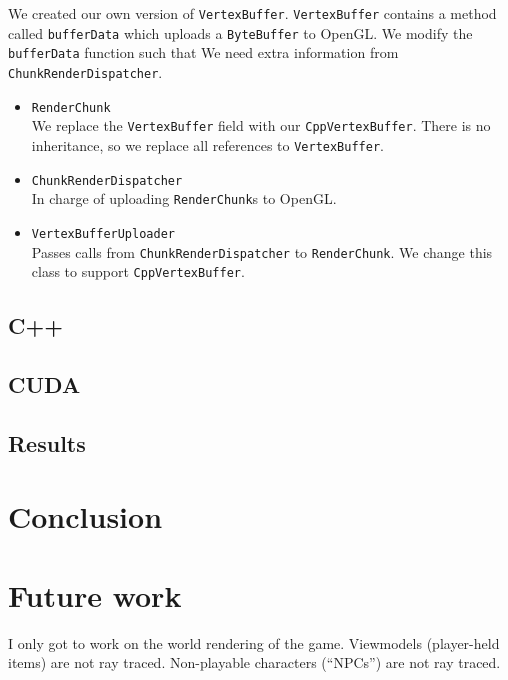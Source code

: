 \documentclass[]{article}
\begin{document}
We created our own version of \texttt{VertexBuffer}.
\texttt{VertexBuffer} contains a method called \texttt{bufferData} which uploads a \texttt{ByteBuffer} to OpenGL.
We modify the \texttt{bufferData} function such that 
We need extra information from \texttt{ChunkRenderDispatcher}.

\begin{itemize}
  \item \texttt{RenderChunk} \\
    We replace the \texttt{VertexBuffer} field with our \texttt{CppVertexBuffer}.
    There is no inheritance, so we replace all references to \texttt{VertexBuffer}.
  \item \texttt{ChunkRenderDispatcher} \\
    In charge of uploading \texttt{RenderChunk}s to OpenGL.
  \item \texttt{VertexBufferUploader} \\
  Passes calls from \texttt{ChunkRenderDispatcher} to \texttt{RenderChunk}.
  We change this class to support \texttt{CppVertexBuffer}.
  
\end{itemize}

\subsection{C++}

\subsection{CUDA}

\subsection{Results}

\section{Conclusion}

\section{Future work}
I only got to work on the world rendering of the game.
Viewmodels (player-held items) are not ray traced.
Non-playable characters (\enquote{NPCs}) are not ray traced.

{}
%


\end{document}

